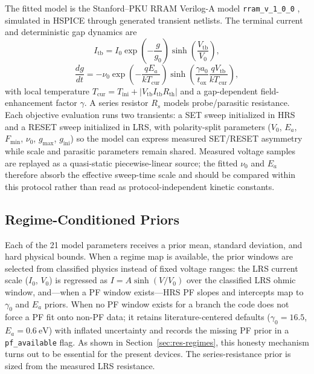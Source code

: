 \documentclass[journal]{IEEEtran}
\begin{document}
The fitted model is the Stanford--PKU RRAM Verilog-A model
\texttt{rram\_v\_1\_0\_0} \cite{guan2012spice,jiang2016verification},
simulated in HSPICE through generated transient netlists.  The terminal
current and deterministic gap dynamics are
\begin{equation}
  I_{\mathrm{tb}}
  = I_0 \exp\left(-\frac{g}{g_0}\right)
    \sinh\left(\frac{V_{\mathrm{tb}}}{V_0}\right),
  \label{eq:stanford-current}
\end{equation}
\begin{equation}
  \frac{dg}{dt}
  =
  -\nu_0
  \exp\left(-\frac{qE_a}{kT_{\mathrm{cur}}}\right)
  \sinh\left(
    \frac{\gamma a_0}{t_{\mathrm{ox}}}
    \frac{qV_{\mathrm{tb}}}{kT_{\mathrm{cur}}}
  \right),
  \label{eq:stanford-gap}
\end{equation}
with local temperature
$T_{\mathrm{cur}} = T_{\mathrm{ini}} +
|V_{\mathrm{tb}}I_{\mathrm{tb}}R_{\mathrm{th}}|$ and a gap-dependent
field-enhancement factor $\gamma$.  A series resistor $R_s$ models
probe/parasitic resistance.  Each objective evaluation runs two transients:
a SET sweep initialized in HRS and a RESET sweep initialized in LRS, with
polarity-split parameters ($V_0$, $E_a$, $F_{\min}$, $\nu_0$, $g_{\max}$,
$g_{\mathrm{ini}}$) so the model can express measured SET/RESET asymmetry
while scale and parasitic parameters remain shared.  Measured voltage
samples are replayed as a quasi-static piecewise-linear source; the fitted
$\nu_0$ and $E_a$ therefore absorb the effective sweep-time scale and should
be compared within this protocol rather than read as protocol-independent
kinetic constants.

\subsection{Regime-Conditioned Priors}
\label{sec:priors}

Each of the 21 model parameters receives a prior mean, standard deviation,
and hard physical bounds.  When a regime map is available, the prior
windows are selected from classified physics instead of fixed voltage
ranges: the LRS current scale ($I_0$, $V_0$) is regressed as
$I=A\sinh(V/V_0)$ over the classified LRS ohmic window, and---when a PF
window exists---HRS PF slopes and intercepts map to $\gamma_0$ and $E_a$
priors.  When no PF window exists for a branch the code does not force a PF
fit onto non-PF data; it retains literature-centered defaults
($\gamma_0=16.5$, $E_a=\SI{0.6}{\electronvolt}$) with inflated uncertainty
and records the missing PF prior in a \texttt{pf\_available} flag.  As shown
in Section~\ref{sec:res-regimes}, this honesty mechanism turns out to be
essential for the present devices.  The series-resistance prior is sized
from the measured LRS resistance.
\end{document}
